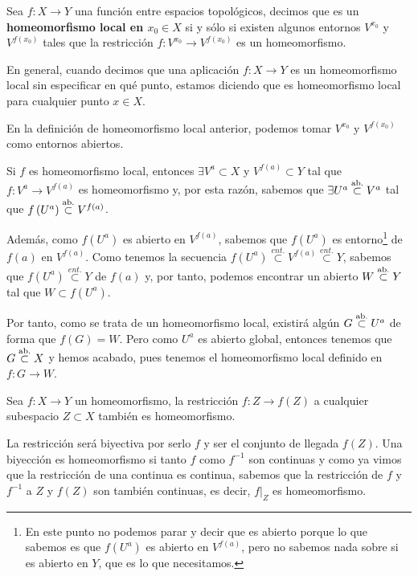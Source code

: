 \begin{defi}
Sea $f: X \rightarrow Y$ una función entre espacios topológicos, decimos que es un \textbf{homeomorfismo local en $x_0 \in X$} si y sólo si existen algunos entornos $V^{x_0}$ y $V^{f\left( x_0 \right)}$ tales que la restricción $f: V^{x_0} \rightarrow V^{f\left( x_0 \right)}$ es un homeomorfismo.
\end{defi}

\begin{obs}
En general, cuando decimos que una aplicación $f:X\rightarrow Y$ es un homeomorfismo local sin especificar en qué punto, estamos diciendo que es homeomorfismo local para cualquier punto $x\in X$.
\end{obs}

\begin{obs}
En la definición de homeomorfismo local anterior, podemos tomar $V^{x_0}$ y $V^{f\left( x_0 \right)}$ como entornos abiertos.
\begin{demo}
Si $f$ es homeomorfismo local, entonces $\exists V^a \subset X$ y $V^{f\left( a \right)} \subset Y$ tal que $f: V^a \rightarrow V^{f\left( a \right)}$ es homeomorfismo y, por esta razón, sabemos que $\exists U^a \stackrel{\text{ab.}}{\subset} V^a$ tal que $f\left( U^a \right) \stackrel{\text{ab.}}{\subset} V^{f\left( a \right)}$. 

Además, como $f(U^a)$ es abierto en $V^{f\left( a \right)}$, sabemos que $f(U^a)$ es entorno\footnote{En este punto no podemos parar y decir que es abierto porque lo que sabemos es que $f(U^a)$ es abierto en $V^{f(a)}$, pero no sabemos nada sobre si es abierto en $Y$, que es lo que necesitamos.} de $f(a)$ en $V^{f(a)}$. Como tenemos la secuencia $f(U^a) \stackrel{ent.}{\subset} V^{f(a)} \stackrel{ent.}{\subset} Y$, sabemos que $f(U^a) \stackrel{ent.}{\subset} Y$ de $f(a)$ y, por tanto, podemos encontrar un abierto $W \stackrel{\text{ab.}}{\subset} Y$ tal que $W\subset f(U^a)$.

Por tanto, como se trata de un homeomorfismo local, existirá algún $G \stackrel{\text{ab.}}{\subset} U^a$ de forma que $f(G) = W$. Pero como $U^a$ es abierto global, entonces tenemos que $G\stackrel{\text{ab.}}{\subset} X$ y hemos acabado, pues tenemos el homeomorfismo local definido en $f: G \rightarrow W$.
\end{demo}
\end{obs}

\begin{prop}
Sea $f: X \rightarrow Y$ un homeomorfismo, la restricción $f: Z \rightarrow f\left( Z \right)$ a cualquier subespacio $Z \subset X$ también es homeomorfismo.
\end{prop}
\begin{demo}
La restricción será biyectiva por serlo $f$ y ser el conjunto de llegada $f(Z)$. Una biyección es homeomorfismo si tanto $f$ como $f^{-1}$ son continuas y como ya vimos que la restricción de una continua es continua, sabemos que la restricción de $f$ y $f^{-1}$ a $Z$ y $f\left( Z \right)$ son también continuas, es decir, $f|_Z$ es homeomorfismo.
\end{demo}

